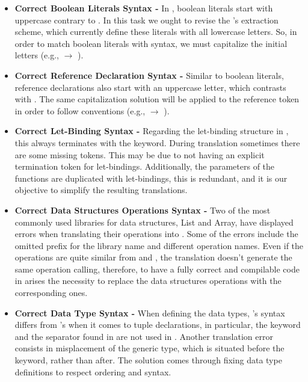 \begin{itemize}

\item \textbf{Correct Boolean Literals Syntax -} In \cml, boolean literals start with uppercase contrary to \ocaml. In this task we ought 
to revise the \whythree's extraction scheme,
which currently define these literals with all lowercase letters. So, in order to match boolean literals with \cml syntax, we must
capitalize the initial letters (e.g.,  $\rightarrow$ ).

\item \textbf{Correct Reference Declaration Syntax -} Similar to boolean literals, reference declarations also start with an uppercase 
letter, which contrasts with \ocaml. The same 
capitalization solution will be applied to the reference token in order to follow \cml conventions 
(e.g.,  $\rightarrow$ ).

\item \textbf{Correct Let-Binding Syntax -} Regarding the let-binding structure in \cml, this always terminates with the  
keyword. During translation sometimes there 
are some missing  tokens. This may be due to \ocaml not having an explicit termination token for let-bindings. Additionally, 
the parameters of the functions are duplicated with let-bindings, this is redundant, and it is our objective to simplify the resulting 
translations.

\item \textbf{Correct Data Structures Operations Syntax -} Two of the most commonly used libraries for data structures, List and Array, 
have displayed errors when translating their operations into 
\cml. Some of the errors include the omitted prefix for the library name and different operation names. 
Even if the operations are quite similar from \ocaml and \cml, the translation doesn't generate the same operation calling, therefore, to 
have a fully correct and compilable code in \cml arises the necessity to replace the data structures operations with the corresponding 
ones.

\item \textbf{Correct Data Type Syntax -} When defining the data types, \cml's syntax differs from \ocaml's when it comes to 
tuple declarations, in particular, 
the  keyword and the separator \inlinecode{*} found in \ocaml are not used in \cml. Another translation error consists in
misplacement of the generic type, which is situated before the  keyword, rather than after. The solution comes 
through fixing data type definitions to respect \cml ordering and syntax.


\end{itemize}
